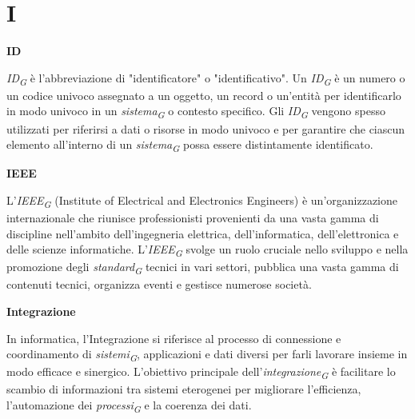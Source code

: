 \documentclass{article}
\begin{document}
\pagebreak
\section*{I}
{}

\vspace{0.4cm}

\textbf{ID}

\vspace{0.1cm}

\textit{ID}\textsubscript{\textit{G}} è l'abbreviazione di "identificatore" o "identificativo". Un \textit{ID}\textsubscript{\textit{G}} è un numero o un codice univoco assegnato a un oggetto, un record o un'entità per identificarlo in modo univoco in un \textit{sistema}\textsubscript{\textit{G}} o contesto specifico. Gli \textit{ID}\textsubscript{\textit{G}} vengono spesso utilizzati per riferirsi a dati o risorse in modo univoco e per garantire che ciascun elemento all'interno di un \textit{sistema}\textsubscript{\textit{G}} possa essere distintamente identificato.

\vspace{0.4cm}

\textbf{IEEE}

\vspace{0.1cm}

L'\textit{IEEE}\textsubscript{\textit{G}} (Institute of Electrical and Electronics Engineers) è un'organizzazione internazionale che riunisce professionisti provenienti da una vasta gamma di discipline nell'ambito dell'ingegneria elettrica, dell'informatica, dell'elettronica e delle scienze informatiche. L'\textit{IEEE}\textsubscript{\textit{G}} svolge un ruolo cruciale nello sviluppo e nella promozione degli \textit{standard}\textsubscript{\textit{G}} tecnici in vari settori, pubblica una vasta gamma di contenuti tecnici, organizza eventi e gestisce numerose società.

\vspace{0.4cm}

\textbf{Integrazione}

\vspace{0.1cm}

In informatica, l'Integrazione si riferisce al processo di connessione e coordinamento di \textit{sistemi}\textsubscript{\textit{G}}, applicazioni e dati diversi per farli lavorare insieme in modo efficace e sinergico. L'obiettivo principale dell'\textit{integrazione}\textsubscript{\textit{G}} è facilitare lo scambio di informazioni tra sistemi eterogenei per migliorare l'efficienza, l'automazione dei \textit{processi}\textsubscript{\textit{G}} e la coerenza dei dati.
\end{document}
